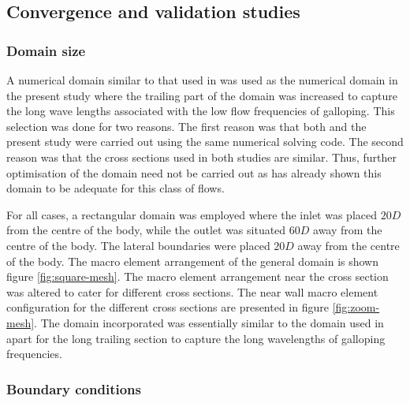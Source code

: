  
\subsection{Convergence and validation studies}

\subsubsection{Domain size}

A numerical domain similar to that used in \citet{Leontini2013} was used  as the numerical domain in the present study where the trailing part of the domain was increased to capture the long wave lengths associated with the low flow frequencies of galloping. This selection was done for two reasons. The first reason was that both  \citet{Leontini2013} and the present study were carried out using the same numerical solving code. The second reason was that the cross sections used in both studies are similar. Thus, further optimisation of the domain need not be carried out as \citet{Leontini2013} has already shown this domain to be adequate for this class of flows.

For all cases, a rectangular domain was employed where the inlet was placed $20D$ from the centre of the body, while the outlet was situated $60D$ away from the centre of the body. The lateral boundaries were placed $20D$ away from the centre of the body. The macro element arrangement of the general domain is shown figure \ref{fig:square-mesh}. The macro element arrangement near the cross section was altered to cater for different cross sections. The near wall macro element configuration for the different cross sections are presented in figure \ref{fig:zoom-mesh}. The domain incorporated was essentially similar to the domain used in \citet{Leontini2013} apart for the long trailing section to capture the long wavelengths of galloping frequencies. 
 
 
 
 
 
 
 \subsubsection{Boundary conditions}
 
